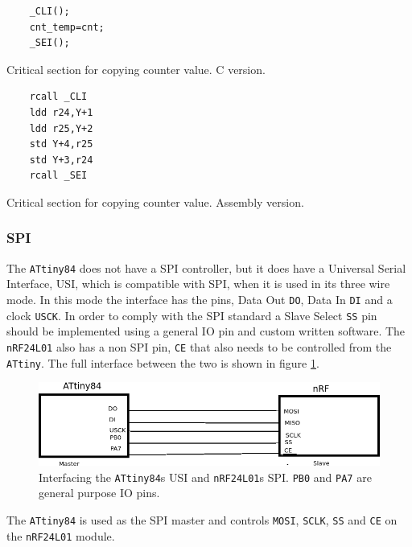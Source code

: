 \begin{listing}[h] 
\begin{verbatim}
	_CLI();
	cnt_temp=cnt;
	_SEI();
\end{verbatim}
\caption{Critical section for copying counter value. C version.}
\label{code:critical_section_c}
\end{listing}

{\renewcommand\fcolorbox[4][]{\textcolor{cyan}{\strut#4}}
\begin{listing}[h]
\begin{verbatim}
	rcall _CLI
	ldd r24,Y+1
	ldd r25,Y+2
	std Y+4,r25
	std Y+3,r24
	rcall _SEI
\end{verbatim}
\caption{Critical section for copying counter value. Assembly version.}
\label{code:critical_section_asm}
\end{listing}


\subsubsection{SPI} %
\label{ssub:spi}
The \texttt{ATtiny84} does not have a SPI controller, but it does have a Universal Serial Interface, USI, which is compatible with SPI, when it is used in its three wire mode.
In this mode the interface has the pins, Data Out \texttt{DO}, Data In \texttt{DI} and a clock \texttt{USCK}.
In order to comply with the SPI standard a Slave Select \texttt{SS} pin should be implemented using a general IO pin and custom written software.
The \texttt{nRF24L01} also has a non SPI pin, \texttt{CE} that also needs to be controlled from the \texttt{ATtiny}.
The full interface between the two is shown in figure \ref{fig:tiny_nrf_com}.

\begin{figure}[h]
	\centering
	\includegraphics[width=.8\linewidth]{graphics/tiny_nrf_com}
	\caption[Interface between ATtiny84 and nRF24L01.]{Interfacing the \texttt{ATtiny84}s USI and \texttt{nRF24L01}s SPI. \texttt{PB0} and \texttt{PA7} are general purpose IO pins.}
	\label{fig:tiny_nrf_com}
\end{figure}
The \texttt{ATtiny84} is used as the SPI master and controls \texttt{MOSI}, \texttt{SCLK}, \texttt{SS} and \texttt{CE} on the \texttt{nRF24L01} module.

}
